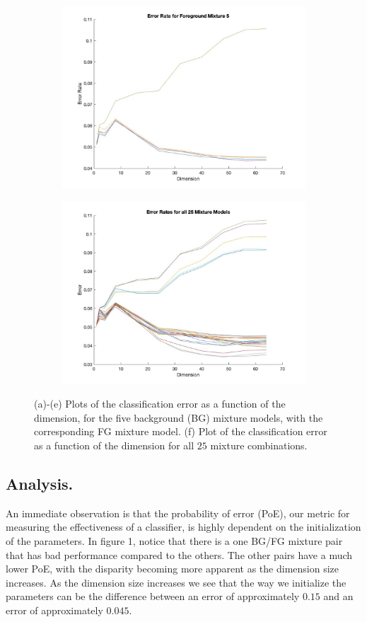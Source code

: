 \documentclass[10pt]{article}
\begin{document}
\begin{figure}[H]
\begin{subfigure}{0.5\textwidth}
		\includegraphics[scale=0.20]{part1_mix5.jpg}
		\caption{}
	\end{subfigure}
	\begin{subfigure}{0.5\textwidth}
		\centering 
		\includegraphics[scale=0.20]{part1_totalerror.jpg}
		\caption{}
	\end{subfigure}
	\caption{(a)-(e) Plots of the classification error as a function of the dimension, for the five background (BG) mixture models, with the corresponding FG mixture model. (f) Plot of the classification error as a function of the dimension for all $25$ mixture combinations.}
\end{figure}
\subsection{Analysis.}
An immediate observation is that the probability of error (PoE), our metric for measuring the effectiveness of a classifier, is highly dependent on the initialization of the parameters. In figure 1, notice that there is a one BG/FG mixture pair that has bad performance compared to the others. The other pairs have a much lower PoE, with the disparity becoming more apparent as the dimension size increases. As the dimension size increases we see that the way we initialize the parameters can be the difference between an error of approximately $0.15$ and an error of approximately $0.045$. 
\end{document}
